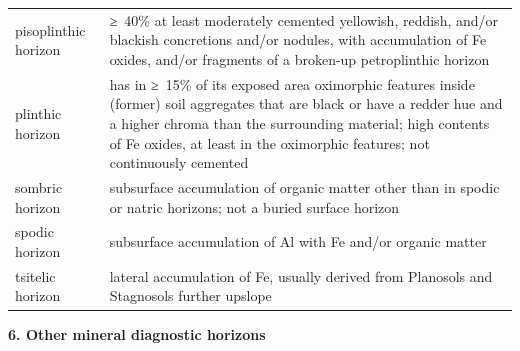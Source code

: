 \documentclass[
  letterpaper,
  DIV=11,
  numbers=noendperiod]{scrreprt}
\begin{document}
\begin{longtable}[]{@{}
  >{\raggedright\arraybackslash}p{}
  >{\raggedright\arraybackslash}p{}@{}}
pisoplinthic horizon & ≥~40\% at least moderately cemented yellowish,
reddish, and/or blackish concretions and/or nodules, with accumulation
of Fe oxides, and/or fragments of a broken-up petroplinthic horizon \\
plinthic horizon & has in ≥~15\% of its exposed area oximorphic features
inside (former) soil aggregates that are black or have a redder hue and
a higher chroma than the surrounding material; high contents of Fe
oxides, at least in the oximorphic features; not continuously
cemented \\
sombric horizon & subsurface accumulation of organic matter other than
in spodic or natric horizons; not a buried surface horizon \\
spodic horizon & subsurface accumulation of Al with Fe and/or organic
matter \\
tsitelic horizon & lateral accumulation of Fe, usually derived from
Planosols and Stagnosols further upslope \\
\bottomrule()
\end{longtable}

\textbf{6. Other mineral diagnostic horizons}
\end{document}
